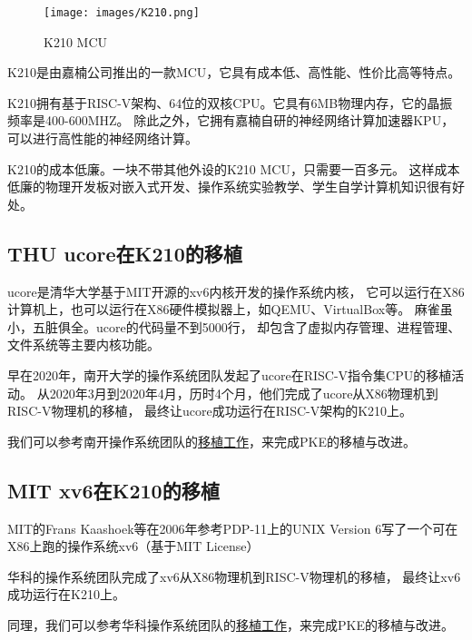 \begin{figure}[htbp]
    \vspace{13pt} %
    \centering
    \texttt{[image: images/K210.png]}
    \caption{K210 MCU}\label{K210 MCU} %
\end{figure}

K210是由嘉楠公司推出的一款MCU，它具有成本低、高性能、性价比高等特点\cite{2018嘉楠科技勘智}。

K210拥有基于RISC-V架构、64位的双核CPU。它具有6MB物理内存，它的晶振频率是400-600MHZ。
除此之外，它拥有嘉楠自研的神经网络计算加速器KPU，可以进行高性能的神经网络计算。

K210的成本低廉。一块不带其他外设的K210 MCU，只需要一百多元。
这样成本低廉的物理开发板对嵌入式开发、操作系统实验教学、学生自学计算机知识很有好处。

\subsection{THU ucore在K210的移植}

ucore是清华大学基于MIT开源的xv6内核开发的操作系统内核，
它可以运行在X86计算机上，也可以运行在X86硬件模拟器上，如QEMU、VirtualBox等。
麻雀虽小，五脏俱全。ucore的代码量不到5000行，
却包含了虚拟内存管理、进程管理、文件系统等主要内核功能。

早在2020年，南开大学的操作系统团队发起了ucore在RISC-V指令集CPU的移植活动。
从2020年3月到2020年4月，历时4个月，他们完成了ucore从X86物理机到RISC-V物理机的移植，
最终让ucore成功运行在RISC-V架构的K210上。

我们可以参考南开操作系统团队的\href{https://github.com/NKU-EmbeddedSystem/riscv64-ucore}{移植工作}，来完成PKE的移植与改进。

\subsection{MIT xv6在K210的移植}

MIT的Frans Kaashoek等在2006年参考PDP-11上的UNIX Version 6写了一个可在X86上跑的操作系统xv6（基于MIT License）\cite{张治国2020Xv6}

华科的操作系统团队完成了xv6从X86物理机到RISC-V物理机的移植，
最终让xv6成功运行在K210上。

同理，我们可以参考华科操作系统团队的\href{https://github.com/HUST-OS/xv6-k210}{移植工作}，来完成PKE的移植与改进。